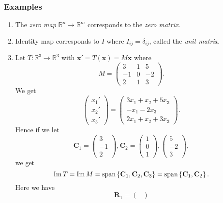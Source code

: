 \documentclass[a4paper]{article}
\begin{document}
\subsubsection{Examples}
\begin{example}
  \begin{enumerate}[(1)]
    \item The \textit{zero map} $ \mathbb{R}^{n}\to \mathbb{R}^{m} $
      corresponds to the \textit{zero matrix}.
    \item Identity map corresponds to $ I $ where $
      I_{ij}=\delta_{ij} $, called the \textit{unit matrix}.
    \item Let $ T:\mathbb{R}^{3}\to \mathbb{R}^{3} $ with $
      \mathbf{x}'=T(\mathbf{x})=M \mathbf{x} $ where
      \[
        M=
        \begin{pmatrix}
          3&1&5\\-1&0&-2\\2&1&3
        \end{pmatrix}
      .\]
      We get
      \[
        \begin{pmatrix}
          x_1'\\x_2'\\x_3'
        \end{pmatrix}=
        \begin{pmatrix}
          3x_1+x_2+5x_3\\-x_1-2x_3\\2x_1+x_2+3x_3
        \end{pmatrix}
      .\]
      Hence if we let
      \[
        \mathbf{C}_1=
        \begin{pmatrix}
          3\\-1\\2
        \end{pmatrix},
        \mathbf{C}_2=
        \begin{pmatrix}
          1\\0\\1
        \end{pmatrix},
        \begin{pmatrix}
          5\\-2\\3
        \end{pmatrix}
      ,\]
      we get
      \[
        \operatorname{Im} T=\operatorname{Im} M = \operatorname{span}\left\{
        \mathbf{C}_1,\mathbf{C}_2,\mathbf{C}_3\right\}=\operatorname{span}\left\{
        \mathbf{C}_1, \mathbf{C}_2\right\}
      .\]
      Here we have
      \[
        \mathbf{R}_1=
        \begin{pmatrix}

\end{pmatrix}\]
\end{enumerate}
\end{example}
\end{document}
